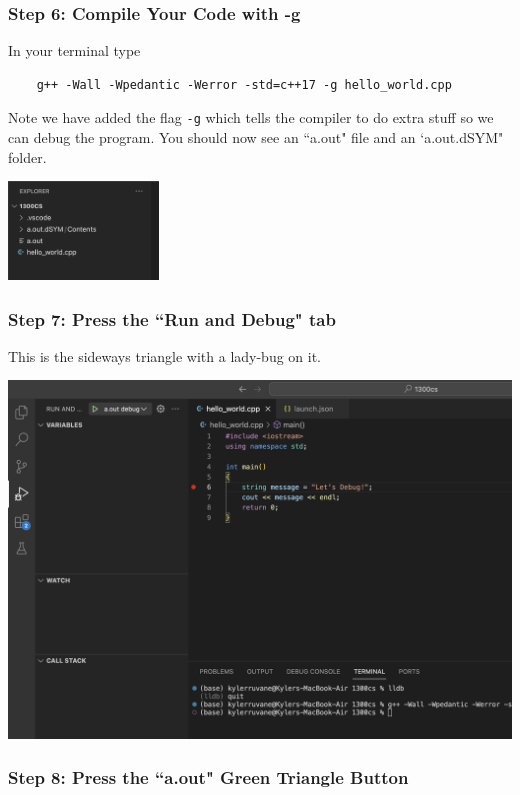 \subsubsection{Step 6: Compile Your Code with -g}

In your terminal type

\begin{verbatim}
    g++ -Wall -Wpedantic -Werror -std=c++17 -g hello_world.cpp
\end{verbatim}

Note we have added the flag \texttt{-g} which tells the compiler to do extra stuff so we can debug the program. You should now see an ``a.out" file and an `a.out.dSYM" folder.

\includegraphics[width=0.3\textwidth]{images/macDebuggerSetup/debugger_mac_7.png}

\subsubsection{Step 7: Press the ``Run and Debug" tab}

This is the sideways triangle with a lady-bug on it.

\includegraphics[width=\textwidth]{images/macDebuggerSetup/debugger_mac_8.png}

\subsubsection{Step 8: Press the ``a.out" Green Triangle Button}

